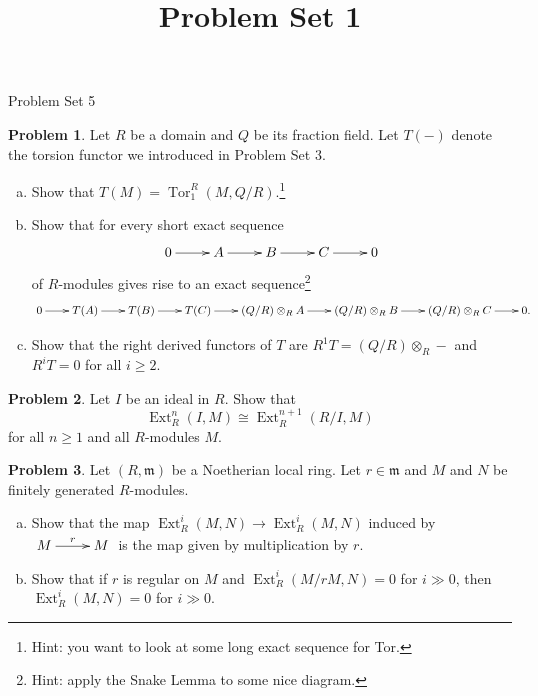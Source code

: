 \documentclass[11pt]{article}
\title{}
\date{\vspace{-0.5in}}
\title{Problem Set 1}
\DeclareMathOperator{\Tor}{Tor}
\DeclareMathOperator{\Ext}{Ext}
\newcommand{\m}{\mathfrak{m}}
\theoremstyle{definition}
\newtheorem{problem}{Problem}
\begin{document}
\thispagestyle{fancy}
\pagestyle{fancy}


\begin{center}
	{\LARGE Problem Set 5}
\end{center}


\begin{problem}
	Let $R$ be a domain and $Q$ be its fraction field. Let $T(-)$ denote the torsion functor we introduced in Problem Set 3. 
	\begin{enumerate}[a)]
		\item Show that $T(M) = \Tor_1^R(M,Q/R)$.\footnote{Hint: you want to look at some long exact sequence for Tor.}
		\item Show that for every short exact sequence
	$$\xymatrix{0 \ar[r] & A \ar[r] & B \ar[r] & C \ar[r] & 0}$$
	of $R$-modules gives rise to an exact sequence\footnote{Hint: apply the Snake Lemma to some nice diagram.}
	$$\xymatrix@C=7mm{0 \ar[r] & T(A) \ar[r] & T(B) \ar[r] & T(C) \ar[r] & (Q/R) \otimes_R A \ar[r] & (Q/R) \otimes_R B \ar[r] & (Q/R) \otimes_R C \ar[r] & 0.}$$
	\item Show that the right derived functors of $T$ are $R^1T = (Q/R) \otimes_R -$ and $R^iT = 0$ for all $i \geqslant 2$.	
	\end{enumerate}
	\end{problem}
	
	\vfill


\begin{problem}
	Let $I$ be an ideal in $R$. Show that
	$$\Ext^{n}_R(I,M) \cong \Ext^{n+1}_R(R/I,M)$$
	for all $n \geqslant 1$ and all $R$-modules $M$.
\end{problem}

\vfill

\begin{problem}
	Let $(R,\m)$ be a Noetherian local ring. Let $r \in \m$ and $M$ and $N$ be finitely generated $R$-modules.
	\begin{enumerate}[a)]
		\item Show that the map $\Ext^i_R(M,N) \to \Ext^i_R(M,N)$ induced by $\xymatrix{M \ar[r]^-r & M}$ is the map given by multiplication by $r$.
		\item Show that if $r$ is regular on $M$ and $\Ext^i_R(M/rM,N) = 0$ for $i \gg 0$, then $\Ext^i_R(M,N) = 0$ for $i \gg 0$.
	\end{enumerate}
\end{problem}

\vfill
\end{document}
